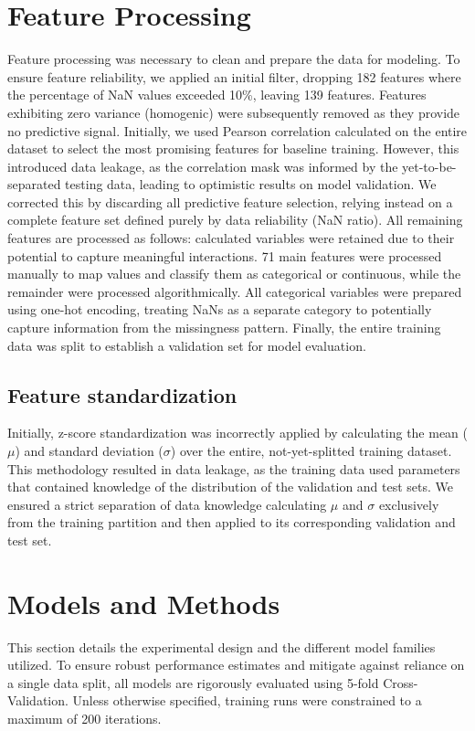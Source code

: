 \documentclass[10pt,conference,compsocconf]{IEEEtran}
\begin{document}
\section{Feature Processing}
Feature processing was necessary to clean and prepare the data for modeling. To ensure feature reliability, we applied an initial filter, dropping 182 features where the percentage of NaN values exceeded 10\%, leaving 139 features. Features exhibiting zero variance (homogenic) were subsequently removed as they provide no predictive signal. Initially, we used Pearson correlation calculated on the entire dataset to select the most promising features for baseline training. However, this introduced data leakage, as the correlation mask was informed by the yet-to-be-separated testing data, leading to optimistic results on model validation. We corrected this by discarding all predictive feature selection, relying instead on a complete feature set defined purely by data reliability (NaN ratio). All remaining features are processed as follows: calculated variables were retained due to their potential to capture meaningful interactions. 71 main features were processed manually to map values and classify them as categorical or continuous, while the remainder were processed algorithmically. All categorical variables were prepared using one-hot encoding, treating NaNs as a separate category to potentially capture information from the missingness pattern. Finally, the entire training data was split to establish a validation set for model evaluation.

\subsection{Feature standardization}
Initially, z-score standardization was incorrectly applied by calculating the mean ($\mu$) and standard deviation ($\sigma$) over the entire, not-yet-splitted training dataset. This methodology resulted in data leakage, as the training data used parameters that contained knowledge of the distribution of the validation and test sets. We ensured a strict separation of data knowledge calculating $\mu$ and $\sigma$ exclusively from the training partition and then applied to its corresponding validation and test set.


\section{Models and Methods}
This section details the experimental design and the different model families utilized. To ensure robust performance estimates and mitigate against reliance on a single data split, all models are rigorously evaluated using 5-fold Cross-Validation. Unless otherwise specified, training runs were constrained to a maximum of 200 iterations.
\end{document}
